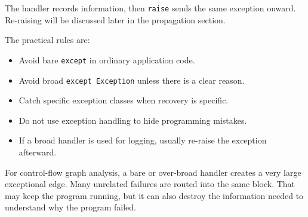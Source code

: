 The handler records information, then \texttt{raise} sends the same exception onward. Re-raising will be discussed later in the propagation section.

The practical rules are:

\begin{itemize}
    \item Avoid bare \texttt{except} in ordinary application code.
    \item Avoid broad \texttt{except Exception} unless there is a clear reason.
    \item Catch specific exception classes when recovery is specific.
    \item Do not use exception handling to hide programming mistakes.
    \item If a broad handler is used for logging, usually re-raise the exception afterward.
\end{itemize}

For control-flow graph analysis, a bare or over-broad handler creates a very large exceptional edge. Many unrelated failures are routed into the same block. That may keep the program running, but it can also destroy the information needed to understand why the program failed.